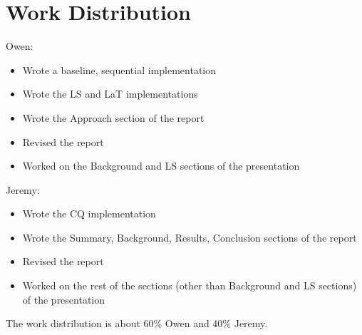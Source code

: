 \documentclass[12pt]{article}
\begin{document}
\section{Work Distribution}
Owen:
\begin{itemize}
    \item Wrote a baseline, sequential implementation
    \item Wrote the LS and LaT implementations
    \item Wrote the Approach section of the report
    \item Revised the report
    \item Worked on the Background and LS sections of the presentation
\end{itemize}

Jeremy:
\begin{itemize}
    \item Wrote the CQ implementation
    \item Wrote the Summary, Background, Results, Conclusion sections of the report
    \item Revised the report
    \item Worked on the rest of the sections (other than Background and LS sections) of the presentation
\end{itemize}

The work distribution is about 60\% Owen and 40\% Jeremy.



\end{document}
